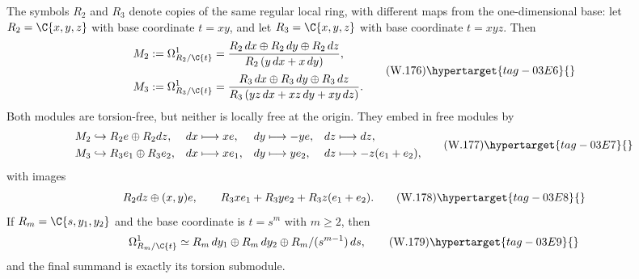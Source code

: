 
\begin{proposition}
\hypertarget{tag-03IP}{}\label{wbII:prop:relative-local}


The symbols $R_2$ and $R_3$ denote copies of the same regular local ring,
with different maps from the one-dimensional base:
let $R_2=\C\{x,y,z\}$ with base coordinate $t=xy$, and let
$R_3=\C\{x,y,z\}$ with base coordinate $t=xyz$.  Then
\[
\begin{aligned}
 M_2&:=\Omega^1_{R_2/\C\{t\}}
 =\frac{R_2\,dx\oplus R_2\,dy\oplus R_2\,dz}
        {R_2\,(y\,dx+x\,dy)},\\[2pt]
 M_3&:=\Omega^1_{R_3/\C\{t\}}
 =\frac{R_3\,dx\oplus R_3\,dy\oplus R_3\,dz}
        {R_3\,(yz\,dx+xz\,dy+xy\,dz)}.
\end{aligned}
\tag{W.176}\hypertarget{tag-03E6}{}\label{wbII:eq:CN:6.1}
\]
Both modules are torsion-free, but neither is locally free at the origin.
They embed in free modules by
\[
\begin{aligned}
 M_2&\hookrightarrow R_2e\oplus R_2dz,
 &dx&\longmapsto xe,&dy&\longmapsto-ye,&dz&\longmapsto dz,\\
 M_3&\hookrightarrow R_3e_1\oplus R_3e_2,
 &dx&\longmapsto xe_1,&dy&\longmapsto ye_2,&dz&\longmapsto-z(e_1+e_2),
\end{aligned}
\tag{W.177}\hypertarget{tag-03E7}{}\label{wbII:eq:CN:6.2}
\]
with images
\[
 R_2dz\oplus (x,y)e,
 \qquad
 R_3xe_1+R_3ye_2+R_3z(e_1+e_2).
\tag{W.178}\hypertarget{tag-03E8}{}\label{wbII:eq:CN:6.3}
\]
If $R_m=\C\{s,y_1,y_2\}$ and the base coordinate is $t=s^m$ with
$m\ge2$, then
\[
\Omega^1_{R_m/\C\{t\}}
\simeq R_m\,dy_1\oplus R_m\,dy_2
       \oplus R_m/(s^{m-1})\,ds,
\tag{W.179}\hypertarget{tag-03E9}{}\label{wbII:eq:CN:6.4}
\]
and the final summand is exactly its torsion submodule.
\end{proposition}


